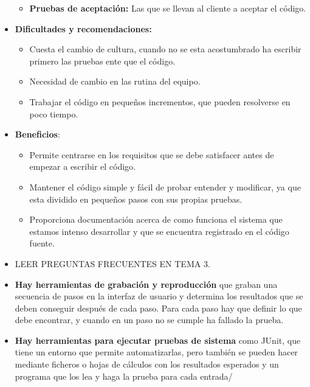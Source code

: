 \documentclass[12pt, twoside, openright]{report} %
\begin{document}
\begin{itemize}
\begin{itemize}
  \item \textbf{Pruebas de aceptación:} Las que se llevan al cliente a
    aceptar el código.
    
  \end{itemize}
\item \textbf{Dificultades y recomendaciones:}
  

  \begin{itemize}
  \item Cuesta el cambio de cultura, cuando no se esta acostumbrado ha
    escribir primero las pruebas ente que el código.
    
  \item Necesidad de cambio en las rutina del equipo.
    
  \item Trabajar el código en pequeños incrementos, que pueden resolverse en
    poco tiempo.
    
  \end{itemize}
\item \textbf{Beneficios}:
  

  \begin{itemize}
  \item Permite centrarse en los requisitos que se debe satisfacer antes de
    empezar a escribir el código.
    
  \item Mantener el código simple y fácil de probar entender y modificar, ya
    que esta dividido en pequeños pasos con sus propias pruebas.
    
  \item Proporciona documentación acerca de como funciona el sistema que
    estamos intenso desarrollar y que se encuentra registrado en el
    código fuente.
    
  \end{itemize}
\item LEER PREGUNTAS FRECUENTES EN TEMA 3.
  
\item \textbf{Hay herramientas de grabación y reproducción} que graban una
  secuencia de pasos en la interfaz de usuario y determina los
  resultados que se deben conseguir después de cada paso. Para cada paso
  hay que definir lo que debe encontrar, y cuando en un paso no se
  cumple ha fallado la prueba.
  
\item \textbf{Hay herramientas para ejecutar pruebas de sistema} como JUnit,
  que tiene un entorno que permite automatizarlas, pero también se
  pueden hacer mediante ficheros o hojas de cálculos con los resultados
  esperados y un programa que los lea y haga la prueba para cada
  entrada/
  
\end{itemize}
\end{document}
